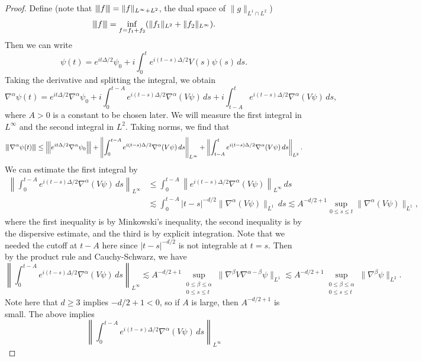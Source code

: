 \begin{proof}
  Define (note that $\left\lvert\hspace{-1 pt}\left\lvert\hspace{-1 pt}\left\lvert {f}\right\lvert\hspace{-1 pt}\right\lvert\hspace{-1 pt}\right\lvert = \|f\|_{L^\infty + L^2}$, the dual space of $\|g\|_{L^1 \cap  L^2}$)
  \[
    \left\lvert\hspace{-1 pt}\left\lvert\hspace{-1 pt}\left\lvert {f}\right\lvert\hspace{-1 pt}\right\lvert\hspace{-1 pt}\right\lvert = \inf_{f = f_1 + f_2} (\|f_1\|_{L^2} + \|f_2\|_{L^\infty}).
  \]
  Then we can write
  \[
    \psi(t) = e^{it\Delta / 2} \psi_0 + i \int_0^t e^{i(t - s)\Delta / 2} V(s) \psi(s)\, ds.
  \]
  Taking the derivative and splitting the integral, we obtain
  \[
    \nabla^\alpha \psi(t) = e^{it \Delta / 2} \nabla^\alpha \psi_0
    + i \int_0^{t - A} e^{i(t - s)\Delta / 2} \nabla^\alpha (V\psi) \, ds
    + i \int_{t - A}^t e^{i(t - s)\Delta / 2} \nabla^\alpha (V\psi) \, ds,
  \]
  where $A > 0$ is a constant to be chosen later.
  We will measure the first integral in $L^\infty$ and
  the second integral in $L^2$. Taking norms, we
  find that
  \[
    \left\lvert\hspace{-1 pt}\left\lvert\hspace{-1 pt}\left\lvert {\nabla^\alpha \psi(t)}\right\lvert\hspace{-1 pt}\right\lvert\hspace{-1 pt}\right\lvert
    \le \left\lvert\hspace{-1 pt}\left\lvert\hspace{-1 pt}\left\lvert {e^{it\Delta / 2} \nabla^\alpha \psi_0}\right\lvert\hspace{-1 pt}\right\lvert\hspace{-1 pt}\right\lvert
    + \left\|\int_0^{t - A} e^{i(t - s)\Delta / 2} \nabla^\alpha (V\psi) \, ds\right\|_{L^\infty}
    + \left\|\int_{t - A}^t e^{i(t - s)\Delta / 2} \nabla^\alpha (V\psi) \, ds\right\|_{L^2}.
  \]
  We can estimate the first integral by
  \begin{align*}
    \left\|\int_0^{t - A} e^{i(t - s) \Delta / 2} \nabla^\alpha(V \psi)\, ds \right\|_{L^\infty}
    &\le \int_0^{t - A} \left\|e^{i(t - s)\Delta / 2} \nabla^\alpha(V \psi)\right\|_{L^\infty}\, ds \\
    &\lesssim \int_0^{t - A} |t - s|^{-d / 2} \|\nabla^\alpha(V \psi)\|_{L^1}\, ds
    \lesssim A^{-d / 2 + 1} \sup_{0 \le s \le t} \|\nabla^\alpha(V \psi)\|_{L^1},
  \end{align*}
  where the first inequality is by Minkowski's
  inequality, the second inequality is by the dispersive
  estimate, and the third is by explicit integration.
  Note that we needed the cutoff at $t - A$ here since
  $|t - s|^{-d / 2}$ is not integrable at $t = s$.
  Then by the product rule and Cauchy-Schwarz, we have
  \[
    \left\|\int_0^{t - A} e^{i(t - s) \Delta / 2} \nabla^\alpha(V \psi)\, ds \right\|_{L^\infty}
    \lesssim A^{-d / 2 + 1} \sup_{\substack{0 \le \beta \le \alpha \\ 0 \le s \le t}} \|\nabla^{\beta} V \nabla^{\alpha - \beta} \psi\|_{L^1}
    \lesssim A^{-d / 2 + 1} \sup_{\substack{0 \le \beta \le \alpha \\ 0 \le s \le t}} \|\nabla^{\beta} \psi\|_{L^2}.
  \]
  Note here that $d \ge 3$ implies $-d / 2 + 1 < 0$,
  so if $A$ is large, then $A^{-d / 2 + 1}$ is small.
  The above implies
  \[
    \left\|\int_0^{t - A} e^{i(t - s) \Delta / 2} \nabla^\alpha(V \psi)\, ds \right\|_{L^\infty}
\]
\end{proof}

